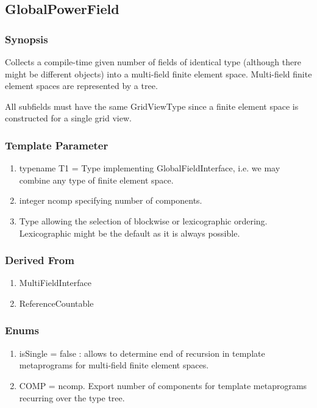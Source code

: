\documentclass[11pt,a4paper,DIV11,%
notitlepage,oneside,abstracton,%
bibtotoc]{scrartcl}
\begin{document}
\subsection{GlobalPowerField}

\subsubsection{Synopsis}

Collects a compile-time given number of fields of identical type (although there might
be different objects) into a multi-field finite element space. 
Multi-field finite element spaces are represented by a tree.

All subfields must have the same GridViewType since a finite element
space is constructed for a single grid view.

\subsubsection{Template Parameter}

\begin{enumerate}[1)]
\item typename T1 = Type implementing GlobalFieldInterface, i.e. we may combine any type
  of finite element space.
\item integer ncomp specifying number of components.
\item Type allowing the selection of blockwise or lexicographic
  ordering. Lexicographic might be the default as it is always possible.
\end{enumerate}

\subsubsection{Derived From}

\begin{enumerate}[1)]
\item MultiFieldInterface
\item ReferenceCountable
\end{enumerate}

\subsubsection{Enums}

\begin{enumerate}[1)]
\item isSingle = false : allows to determine end of recursion in
  template metaprograms for multi-field finite element spaces.
\item COMP = ncomp. Export number of components for template
  metaprograms recurring over the type tree.
\end{enumerate}
\end{document}
